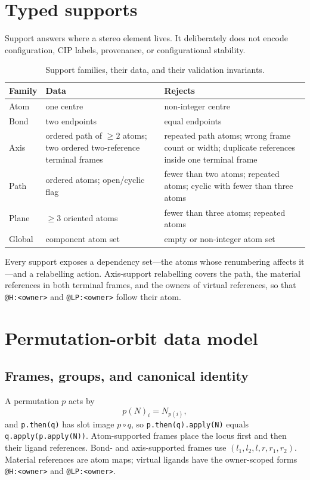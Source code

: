 \documentclass[pdflatex,sn-mathphys-num,referee,lineno]{sn-jnl}
\newcommand{\code}[1]{\texttt{#1}}
\theoremstyle{plain}
\theoremstyle{remark}
\theoremstyle{definition}
\begin{document}
\section{Typed supports}
\label{sec:si-supports}

Support answers where a stereo element lives.  It deliberately does not encode
configuration, CIP labels, provenance, or configurational stability.

\begin{table}[htbp]
\caption{Support families, their data, and their validation invariants.}
\label{tab:supports}
\centering
\begin{tabularx}{\textwidth}{@{}lXX@{}}
\toprule
Family & Data & Rejects \\
\midrule
Atom & one centre & non-integer centre \\
Bond & two endpoints & equal endpoints \\
Axis & ordered path of \(\ge 2\) atoms; two ordered two-reference terminal
frames & repeated path atoms; wrong frame count or width; duplicate references
inside one terminal frame \\
Path & ordered atoms; open/cyclic flag & fewer than two atoms; repeated atoms;
cyclic with fewer than three atoms \\
Plane & \(\ge 3\) oriented atoms & fewer than three atoms; repeated atoms \\
Global & component atom set & empty or non-integer atom set \\
\bottomrule
\end{tabularx}
\end{table}

Every support exposes a dependency set---the atoms whose renumbering affects
it---and a relabelling action.  Axis-support relabelling covers the path, the
material references in both terminal frames, and the owners of virtual
references, so that \code{@H:<owner>} and \code{@LP:<owner>} follow their atom.

\section{Permutation-orbit data model}

\subsection{Frames, groups, and canonical identity}

A permutation \(p\) acts by
\[
 p(N)_i=N_{p(i)},
\]
and \code{p.then(q)} has slot image \(p\circ q\), so
\code{p.then(q).apply(N)} equals \code{q.apply(p.apply(N))}.
Atom-supported frames place the
locus first and then their ligand references.  Bond- and axis-supported frames
use \((l_1,l_2,l,r,r_1,r_2)\).  Material references are atom maps; virtual
ligands have the owner-scoped forms \code{@H:<owner>} and
\code{@LP:<owner>}.
\end{document}

